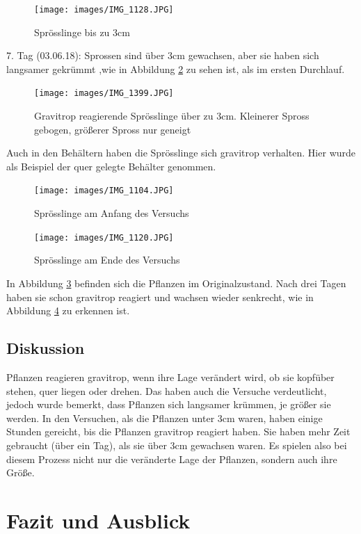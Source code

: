 \documentclass[
a4paper, 
11pt, 
ngerman,
listof=totoc,
bibliography=totocnumbered,
abstracton
]{scrreprt}
\begin{document}
\begin{figure}[H]
	\centering 
	\texttt{[image: images/IMG\_1128.JPG]}
	\caption{Sprösslinge bis zu 3cm \label{Foto 4}}
\end{figure}

7. Tag (03.06.18): Sprossen sind über 3cm gewachsen, aber sie haben sich langsamer gekrümmt ,wie in Abbildung \ref{Foto 5} zu sehen ist, als im ersten Durchlauf.

\begin{figure}[H]
	 \centering 
  \texttt{[image: images/IMG\_1399.JPG]}
  	\caption{Gravitrop reagierende Sprösslinge über zu 3cm. Kleinerer Spross gebogen, größerer Spross nur geneigt \label{Foto 5}}
\end{figure} 

 Auch in den Behältern haben die Sprösslinge sich gravitrop verhalten. Hier wurde als Beispiel der quer gelegte Behälter genommen.

\begin{figure}[H]
	\centering 
	\texttt{[image: images/IMG\_1104.JPG]}
	\caption{Sprösslinge am Anfang des Versuchs \label{Foto 6}}
\end{figure} 

\begin{figure}[H]
	\centering 
	\texttt{[image: images/IMG\_1120.JPG]}
	\caption{Sprösslinge am Ende des Versuchs \label{Foto 7}}
\end{figure} 

In Abbildung \ref{Foto 6} befinden sich die Pflanzen im Originalzustand. Nach drei Tagen haben sie schon gravitrop reagiert und wachsen wieder senkrecht, wie in Abbildung \ref{Foto 7} zu erkennen ist.

\section{Diskussion}

Pflanzen reagieren gravitrop, wenn ihre Lage verändert wird, ob sie kopfüber stehen, quer liegen oder drehen. Das haben auch die Versuche verdeutlicht, jedoch wurde bemerkt, dass Pflanzen sich langsamer krümmen, je größer sie werden. In den Versuchen, als die Pflanzen unter 3cm waren, haben einige Stunden gereicht, bis die Pflanzen gravitrop reagiert haben. Sie haben mehr Zeit gebraucht (über ein Tag), als sie über 3cm gewachsen waren. Es spielen also bei diesem Prozess nicht nur die veränderte Lage der Pflanzen, sondern auch ihre Größe. 


\chapter{Fazit und Ausblick}
\end{document}
